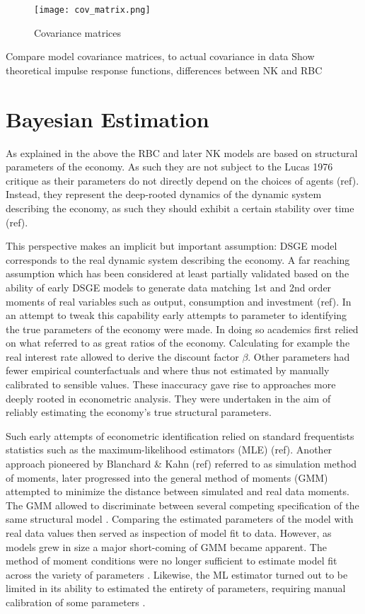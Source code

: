 \documentclass[12pt,a4paper,english]{article} %
\let\oldsection\section
\renewcommand\section{\clearpage\oldsection}
\begin{document}
	\begin{figure}[h]
		\begin{center}
			\texttt{[image: cov\_matrix.png]}
			\caption{Covariance matrices}
		\end{center}
	\end{figure}
	
	Compare model covariance matrices, to actual covariance in data
	Show theoretical impulse response functions, differences between NK and RBC
			
	\section{Bayesian Estimation}
		
	As explained in the above the RBC and later NK models are based on structural parameters of the economy. As such they are not subject to the Lucas 1976 critique as their parameters do not  directly depend on the choices of agents (ref). Instead, they represent the deep-rooted dynamics of the dynamic system describing the economy, as such they should exhibit a certain stability over time (ref). 
	
	This perspective makes an implicit but important assumption: DSGE model corresponds to the real dynamic system describing the economy. A far reaching assumption which has been considered at least partially validated based on the ability of early DSGE models to generate data matching 1st and 2nd order moments of real variables such as output, consumption and investment (ref). 
	In an attempt to tweak this capability  early attempts to parameter to identifying the true parameters of the economy were made. In doing so academics first relied on what \cite{prescott_theory_1986} referred to as great ratios of the economy. Calculating for example the real interest rate allowed to derive the discount factor $\beta$. 
	Other parameters had fewer empirical counterfactuals and where thus not estimated by manually calibrated to sensible values. These inaccuracy gave rise to approaches more deeply rooted in econometric analysis. They were undertaken in the aim of reliably estimating the economy's true structural parameters.
	
	Such early attempts of econometric identification relied on standard frequentists statistics such as the maximum-likelihood estimators (MLE) (ref). Another approach pioneered by Blanchard \& Kahn (ref) referred to as simulation method of moments, later progressed into the general method of moments (GMM) attempted to minimize the distance between simulated and real data moments. The GMM allowed to discriminate between several competing specification of the same structural model \cite{christiano_current_1992}. Comparing the estimated parameters of the model with real data values then served as inspection of model fit to data. However, as models grew in size a major short-coming of GMM became apparent. The method of moment conditions were no longer sufficient to estimate model fit across the variety of parameters \cite{guerron-quintana_bayesian_2013}. Likewise, the ML estimator turned out to be limited in its ability to estimated the entirety of parameters, requiring manual calibration of some parameters \cite{guerron-quintana_bayesian_2013}.
	
\end{document}
